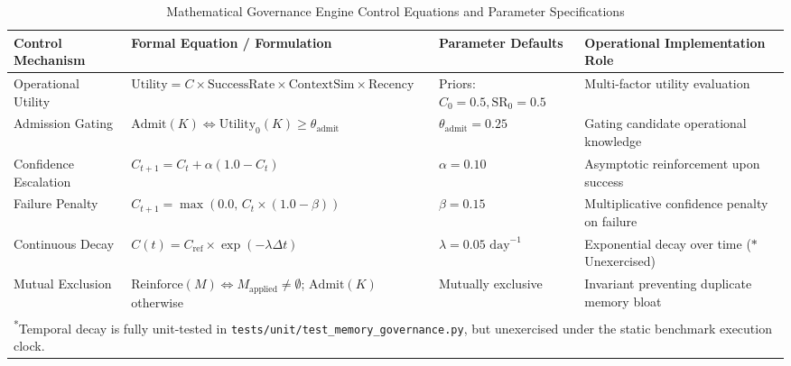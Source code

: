\begin{table}[t]
\centering
\caption{Mathematical Governance Engine Control Equations and Parameter Specifications}
\label{tab:governance_equations}
\begin{tabular}{lllp{4.5cm}}
\hline
\textbf{Control Mechanism} & \textbf{Formal Equation / Formulation} & \textbf{Parameter Defaults} & \textbf{Operational Implementation Role} \\
\hline
Operational Utility & $\text{Utility} = C \times \text{SuccessRate} \times \text{ContextSim} \times \text{Recency}$ & Priors: $C_0=0.5, \text{SR}_0=0.5$ & Multi-factor utility evaluation \\
Admission Gating & $\text{Admit}(K) \iff \text{Utility}_0(K) \ge \theta_{\text{admit}}$ & $\theta_{\text{admit}} = 0.25$ & Gating candidate operational knowledge \\
Confidence Escalation & $C_{t+1} = C_t + \alpha (1.0 - C_t)$ & $\alpha = 0.10$ & Asymptotic reinforcement upon success \\
Failure Penalty & $C_{t+1} = \max(0.0, \, C_t \times (1.0 - \beta))$ & $\beta = 0.15$ & Multiplicative confidence penalty on failure \\
Continuous Decay & $C(t) = C_{\text{ref}} \times \exp(-\lambda \Delta t)$ & $\lambda = 0.05\text{ day}^{-1}$ & Exponential decay over time ($*$Unexercised) \\
Mutual Exclusion & $\text{Reinforce}(M) \iff M_{\text{applied}} \neq \emptyset$; $\text{Admit}(K)$ otherwise & Mutually exclusive & Invariant preventing duplicate memory bloat \\
\hline
\multicolumn{4}{l}{\footnotesize \textsuperscript{*}Temporal decay is fully unit-tested in \texttt{tests/unit/test\_memory\_governance.py}, but unexercised under the static benchmark execution clock.} \\
\end{tabular}
\end{table}

